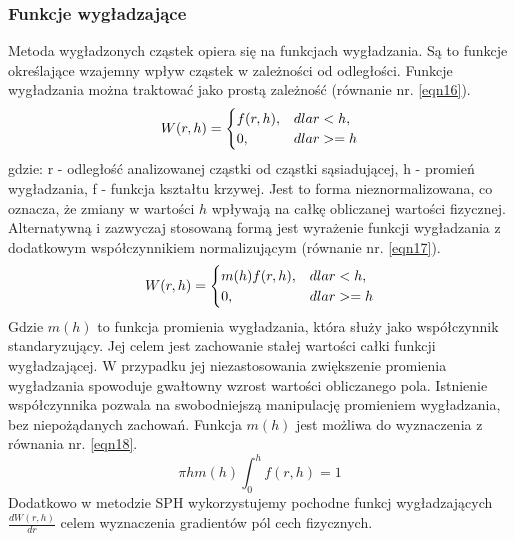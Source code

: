 \documentclass{article}
\begin{document}
\subsubsection{Funkcje wygładzające}
Metoda wygładzonych cząstek opiera się na funkcjach wygładzania. Są to funkcje określające wzajemny wpływ cząstek w zależności od odległości.\newline
Funkcje wygładzania można traktować jako prostą zależność (równanie nr. \ref{eqn16}).
\begin{equation}\label{eqn16}
W(r,h) = 
\begin{cases}
f(r,h), & dla \space r<h,\\
0,    & dla \space r>=h
\end{cases}
\end{equation}
gdzie:\newline
r - odległość analizowanej cząstki od cząstki sąsiadującej,\newline
h - promień wygładzania,\newline
f - funkcja kształtu krzywej.\newline\newline
Jest to forma nieznormalizowana, co oznacza, że zmiany w wartości $h$ wpływają na całkę obliczanej wartości fizycznej.\newline
Alternatywną i zazwyczaj stosowaną formą jest wyrażenie funkcji wygładzania z dodatkowym współczynnikiem normalizującym (równanie nr. \ref{eqn17}).\newline
\begin{equation}\label{eqn17}
W(r,h) = 
\begin{cases}
m(h)f(r,h), & dla \space r<h,\\
0,    & dla \space r>=h
\end{cases}
\end{equation}
\indent
Gdzie $m(h)$ to funkcja promienia wygładzania, która służy jako współczynnik standaryzujący. Jej celem jest zachowanie stałej wartości całki funkcji wygładzającej. 
W przypadku jej niezastosowania zwiększenie promienia wygładzania spowoduje gwałtowny wzrost wartości obliczanego pola. 
Istnienie współczynnika pozwala na swobodniejszą manipulację promieniem wygładzania, bez niepożądanych zachowań.\newline
Funkcja $m(h)$ jest możliwa do wyznaczenia z równania nr. \ref{eqn18}.\newline
\begin{equation}\label{eqn18}
\pi hm(h) \int_0^h{f(r,h)} = 1
\end{equation}
\noindent
Dodatkowo w metodzie SPH wykorzystujemy pochodne funkcj wygładzających $\frac {dW(r,h)}{dr}$ celem wyznaczenia gradientów pól cech fizycznych.\newline
\end{document}

